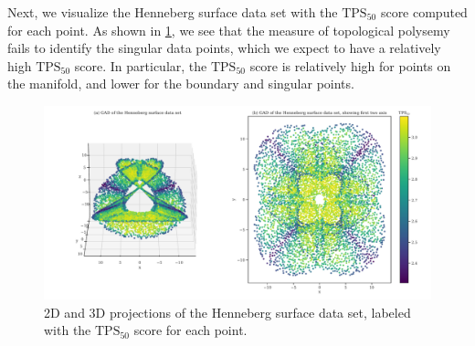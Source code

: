 Next, we visualize the Henneberg surface data set with the $\text{TPS}_{50}$ score computed for each point. As shown in \cref{fig:gad-henneberg-3d-tps-50}, we see that the measure of topological polysemy fails to identify the singular data points, which we expect to have a relatively high $\text{TPS}_{50}$ score. In particular, the $\text{TPS}_{50}$ score is relatively high for points on the manifold, and lower for the boundary and singular points.
\begin{figure}[H]
    \centering
    \includegraphics[width=\textwidth]{thesis/figures/gad-henneberg-3d-tps-50.pdf}
    \caption{2D and 3D projections of the Henneberg surface data set, labeled with the $\text{TPS}_{50}$ score for each point.}
    \label{fig:gad-henneberg-3d-tps-50}
\end{figure}

